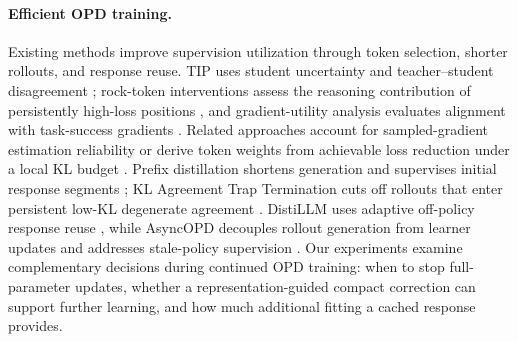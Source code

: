\paragraph{Efficient OPD training.}
Existing methods improve supervision utilization through token selection, shorter rollouts, and response reuse. TIP uses student uncertainty and teacher--student disagreement \citep{xu2026tip}; rock-token interventions assess the reasoning contribution of persistently high-loss positions \citep{jiang2026rock}, and gradient-utility analysis evaluates alignment with task-success gradients \citep{armandpour2026unmasking}. Related approaches account for sampled-gradient estimation reliability \citep{sheng2026ier} or derive token weights from achievable loss reduction under a local KL budget \citep{sadagopan2026utility}. Prefix distillation shortens generation and supervises initial response segments \citep{zhang2026prefix}; KL Agreement Trap Termination cuts off rollouts that enter persistent low-KL degenerate agreement \citep{xin2026kat}. DistiLLM uses adaptive off-policy response reuse \citep{ko2024distillm}, while AsyncOPD decouples rollout generation from learner updates and addresses stale-policy supervision \citep{kang2026async}. Our experiments examine complementary decisions during continued OPD training: when to stop full-parameter updates, whether a representation-guided compact correction can support further learning, and how much additional fitting a cached response provides. 